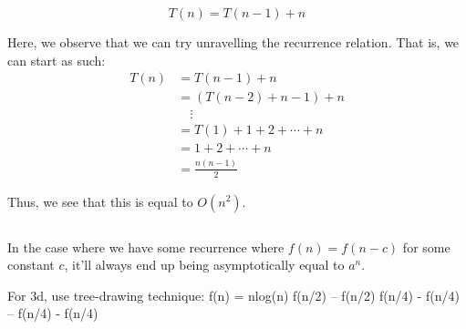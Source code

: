 \documentclass[openany]{book}
\begin{document}
\begin{hw}
	\begin{equation*}
		T(n) = T(n-1) + n
	\end{equation*}
\end{hw}
\begin{solution}
	Here, we observe that we can try unravelling the recurrence relation. That is, we can start as such:
	\begin{align*}
		T(n) &= T(n-1) + n \\
		&= (T(n-2) + n-1) + n \\
		&\quad\vdots \\
		&= T(1) + 1 + 2 + \cdots + n \\
		&= 1 + 2 + \cdots + n \\
		&= \frac{n(n-1)}{2}
	\end{align*}
	
	Thus, we see that this is equal to $O(n^{2})$.
\end{solution}

\begin{hw}
	\begin{equation*}
		
	\end{equation*}
\end{hw}

\begin{rmk}
	In the case where we have some recurrence where $f(n) = f(n-c)$ for some constant $c$, it'll always end up being asymptotically equal to $a^{n}$.
\end{rmk}

For 3d, use tree-drawing technique:
		f(n) = nlog(n)
			f(n/2) -- f(n/2)
f(n/4) - f(n/4) -- f(n/4) - f(n/4)
\end{document}
